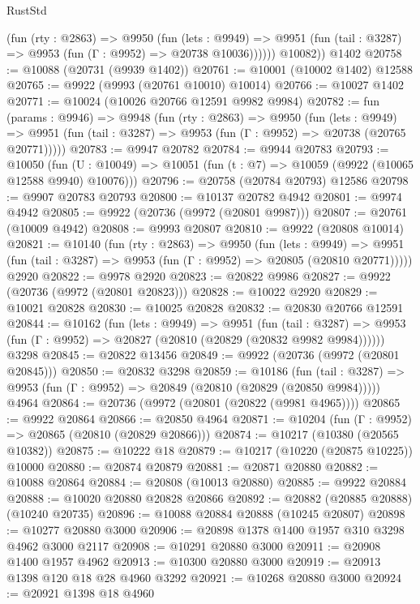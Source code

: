 \begin{lexlean}{RustStd}
\begin{coremodule}
            (fun (rty : @2863) =>
            @9950
              (fun (lets : @9949) =>
              @9951 (fun (tail : @3287) => @9953 (fun (Γ : @9952) => @20738 @10036))))))
        @10082))
    @1402
@20758 := @10088 (@20731 (@9939 @1402))
@20761 := @10001 (@10002 @1402) @12588
@20765 := @9922 (@9993 (@20761 @10010) @10014)
@20766 := @10027 @1402
@20771 := @10024 (@10026 @20766 @12591 @9982 @9984)
@20782 := fun (params : @9946) =>
  @9948
    (fun (rty : @2863) =>
    @9950
      (fun (lets : @9949) =>
      @9951 (fun (tail : @3287) => @9953 (fun (Γ : @9952) => @20738 (@20765 @20771)))))
@20783 := @9947 @20782
@20784 := @9944 @20783
@20793 := @10050
    (fun (U : @10049) => @10051 (fun (t : @7) => @10059 (@9922 (@10065 @12588 @9940) @10076)))
@20796 := @20758 (@20784 @20793) @12586
@20798 := @9907 @20783 @20793
@20800 := @10137 @20782 @4942
@20801 := @9974 @4942
@20805 := @9922 (@20736 (@9972 (@20801 @9987)))
@20807 := @20761 (@10009 @4942)
@20808 := @9993 @20807
@20810 := @9922 (@20808 @10014)
@20821 := @10140
    (fun (rty : @2863) =>
    @9950
      (fun (lets : @9949) =>
      @9951 (fun (tail : @3287) => @9953 (fun (Γ : @9952) => @20805 (@20810 @20771)))))
    @2920
@20822 := @9978 @2920
@20823 := @20822 @9986
@20827 := @9922 (@20736 (@9972 (@20801 @20823)))
@20828 := @10022 @2920
@20829 := @10021 @20828
@20830 := @10025 @20828
@20832 := @20830 @20766 @12591
@20844 := @10162
    (fun (lets : @9949) =>
    @9951
      (fun (tail : @3287) =>
      @9953 (fun (Γ : @9952) => @20827 (@20810 (@20829 (@20832 @9982 @9984))))))
    @3298
@20845 := @20822 @13456
@20849 := @9922 (@20736 (@9972 (@20801 @20845)))
@20850 := @20832 @3298
@20859 := @10186
    (fun (tail : @3287) => @9953 (fun (Γ : @9952) => @20849 (@20810 (@20829 (@20850 @9984)))))
    @4964
@20864 := @20736 (@9972 (@20801 (@20822 (@9981 @4965))))
@20865 := @9922 @20864
@20866 := @20850 @4964
@20871 := @10204 (fun (Γ : @9952) => @20865 (@20810 (@20829 @20866)))
@20874 := @10217 (@10380 (@20565 @10382))
@20875 := @10222 @18
@20879 := @10217 (@10220 (@20875 @10225)) @10000
@20880 := @20874 @20879
@20881 := @20871 @20880
@20882 := @10088 @20864
@20884 := @20808 (@10013 @20880)
@20885 := @9922 @20884
@20888 := @10020 @20880 @20828 @20866
@20892 := @20882 (@20885 @20888) (@10240 @20735)
@20896 := @10088 @20884 @20888 (@10245 @20807)
@20898 := @10277 @20880 @3000
@20906 := @20898 @1378 @1400 @1957 @310 @3298 @4962 @3000 @2117
@20908 := @10291 @20880 @3000
@20911 := @20908 @1400 @1957 @4962
@20913 := @10300 @20880 @3000
@20919 := @20913 @1398 @120 @18 @28 @4960 @3292
@20921 := @10268 @20880 @3000
@20924 := @20921 @1398 @18 @4960

\end{coremodule}
\end{lexlean}

